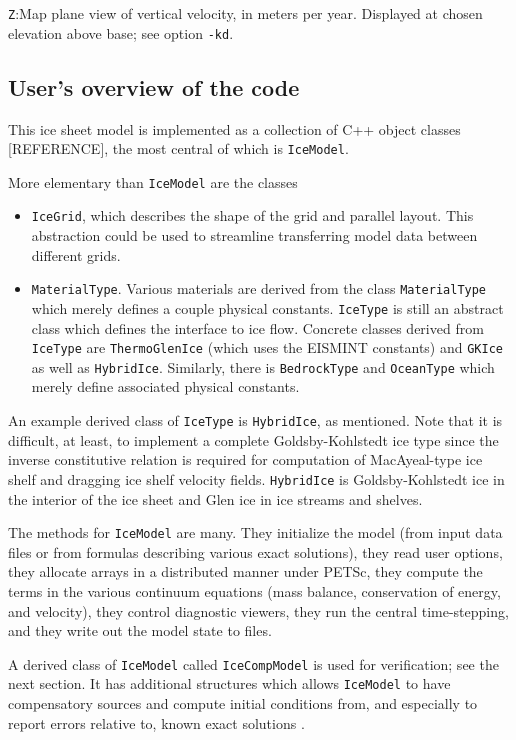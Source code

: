 \documentclass[final]{amsart}
\renewcommand{\t}[1]{\texttt{#1}}
\begin{document}
\verb|Z|:\quad Map plane view of vertical velocity, in meters per year.  Displayed at chosen elevation above base; see option \verb|-kd|.

\subsection{User's overview of the code}  This ice sheet model is implemented as a collection of C++ object classes [REFERENCE], the most central of which is \t{IceModel}.

More elementary than \t{IceModel} are the classes\begin{itemize}
\item \t{IceGrid}, which describes the shape of the grid and parallel
layout. This abstraction could be used to streamline transferring model data between
different grids.
\item \t{MaterialType}.  Various materials are derived from the class \t{MaterialType} which merely defines a couple
physical constants. \t{IceType} is still an abstract class which defines the interface to
ice flow. Concrete classes derived from \t{IceType} are \t{ThermoGlenIce} (which uses the
EISMINT constants) and \t{GKIce} as well as \t{HybridIce}.  Similarly, there is \t{BedrockType} and \t{OceanType} which merely define
associated physical constants.\end{itemize}

An example derived class of \t{IceType} is \t{HybridIce}, as mentioned.  Note that it is difficult, at least, to implement a complete Goldsby-Kohlstedt ice type \cite{GoldsbyKohlstedt} since the inverse constitutive
relation is required for computation of MacAyeal-type ice shelf and dragging ice shelf \cite{MacAyeal} velocity fields. \t{HybridIce} is Goldsby-Kohlstedt ice in the interior of the ice sheet and Glen ice in ice streams and
shelves.

The methods for \t{IceModel} are many.  They initialize the model (from input data files or from formulas describing various exact solutions), they read user options, they allocate arrays in a distributed manner under PETSc, they compute the terms in the various continuum equations (mass balance, conservation of energy, and velocity), they control diagnostic viewers, they run the central time-stepping, and they write out the model state to files.

A derived class of \t{IceModel} called \t{IceCompModel} is used for verification; see the next section.  It has additional structures which allows \t{IceModel} to have compensatory sources and compute initial conditions from, and especially to report errors relative to, known exact solutions \cite{BLKCB,BKL,BK}.
\end{document}
